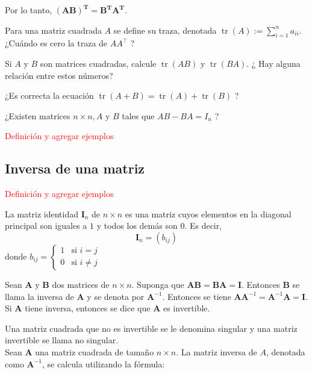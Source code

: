 \begin{}
\begin{solution}
Por lo tanto, $\boldsymbol{(AB)^T} = \boldsymbol{B^T A^T}$.
   
\end{solution}

\begin{exercise}
 Para una matriz cuadrada $A$ se define su traza, denotada $\operatorname{tr}(A):=\sum_{i=1}^n a_{i i}$. ¿Cuándo es cero la traza de $A A^{\top}$ ?    
\end{exercise}
\begin{exercise}
 Si $A$ y $B$ son matrices cuadradas, calcule $\operatorname{tr}(A B)$ y $\operatorname{tr}(B A)$. ¿ Hay alguna relación entre estos números?
\end{exercise}
\begin{exercise}
 ¿Es correcta la ecuación $\operatorname{tr}(A+B)=\operatorname{tr}(A)+\operatorname{tr}(B)$ ?   
\end{exercise}
\begin{exercise}
  ¿Existen matrices $n \times n, A$ y $B$ tales que $A B-B A=I_n$ ?   
\end{exercise}
\textcolor{red}{ Definición y agregar ejemplos}

\subsection{Inversa de una matriz}
\textcolor{red}{ Definición y agregar ejemplos}
\begin{definition}
La matriz identidad $\boldsymbol{I}_n$ de $n \times n$ es una matriz cuyos elementos en la diagonal principal son iguales a $1$ y todos los demás son $0$. Es decir,
$$ \boldsymbol{I}_n = (b_{ij}) $$
donde $b_{ij} = \begin{cases} 1 & \text{si } i = j \\ 0 & \text{si } i \neq j \end{cases} $    
\end{definition}
\begin{definition}
 Sean $\boldsymbol{A}$ y $\boldsymbol{B}$ dos matrices de $n \times n$. Suponga que $\boldsymbol{AB} = \boldsymbol{BA} = \boldsymbol{I}$. Entonces $\boldsymbol{B}$ se llama la inversa de $\boldsymbol{A}$ y se denota por $\boldsymbol{A}^{-1}$. Entonces se tiene $\boldsymbol{AA}^{-1} = \boldsymbol{A}^{-1}\boldsymbol{A} = \boldsymbol{I}$. Si $\boldsymbol{A}$ tiene inversa, entonces se dice que $\boldsymbol{A}$ es invertible.   
\end{definition}
Una matriz cuadrada que no es invertible se le denomina singular y una matriz invertible se 
llama no singular.\\
Sean $\boldsymbol{A}$ una matriz cuadrada de tamaño $n \times n$. La matriz inversa de $A$, denotada como $\boldsymbol{A}^{-1}$, se calcula utilizando la fórmula:


\end{}
